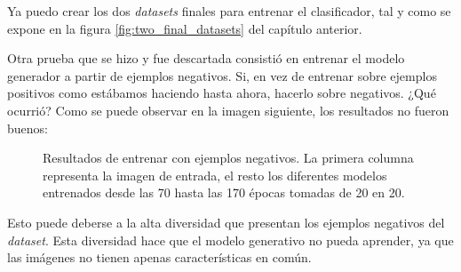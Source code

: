 Ya puedo crear los dos \textit{datasets} finales para entrenar el clasificador, tal y como se expone en la figura \ref{fig:two_final_datasets} del capítulo anterior.

\newpage
Otra prueba que se hizo y fue descartada consistió en entrenar el modelo generador a partir de ejemplos negativos. Si, en vez de entrenar sobre ejemplos positivos como estábamos haciendo hasta ahora, hacerlo sobre negativos. ¿Qué ocurrió? Como se puede observar en la imagen siguiente, los resultados no fueron buenos:

\begin{figure}[H]
\centering
    \caption{Resultados de entrenar con ejemplos negativos. La primera columna representa la imagen de entrada, el resto los diferentes modelos entrenados desde las 70 hasta las 170 épocas tomadas de 20 en 20.}
\end{figure}

Esto puede deberse a la alta diversidad que presentan los ejemplos negativos del \textit{dataset}. Esta diversidad hace que el modelo generativo no pueda aprender, ya que las imágenes no tienen apenas características en común.

